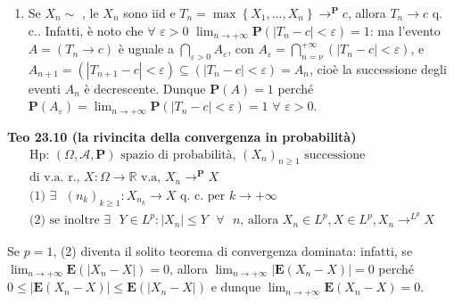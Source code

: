 \documentclass{article}
\begin{document}
\begin{enumerate}
\item Se $X_{n}\sim $ , le $X_{n}$ sono iid e $T_{n}=\max \left\{
X_{1},...,X_{n}\right\} \rightarrow ^{\mathbf{P}}c$, allora $%
T_{n}\rightarrow c$ q. c.. Infatti, \`{e} noto che $\forall $ $\varepsilon
>0 $ $\lim_{n\rightarrow +\infty }\mathbf{P}\left( \left\vert
T_{n}-c\right\vert <\varepsilon \right) =1$: ma l'evento $A=\left(
T_{n}\rightarrow c\right) $ \`{e} uguale a $\bigcap_{\varepsilon
>0}A_{\varepsilon }$, con $A_{\varepsilon }=\bigcap_{n=\nu }^{+\infty
}\left( \left\vert T_{n}-c\right\vert <\varepsilon \right) $, e $%
A_{n+1}=\left( \left\vert T_{n+1}-c\right\vert <\varepsilon \right)
\subseteq \left( \left\vert T_{n}-c\right\vert <\varepsilon \right) =A_{n}$,
cio\`{e} la successione degli eventi $A_{n}$ \`{e} decrescente. Dunque $%
\mathbf{P}\left( A\right) =1$ perch\'{e} $\mathbf{P}\left( A_{\varepsilon
}\right) =\lim_{n\rightarrow +\infty }\mathbf{P}\left( \left\vert
T_{n}-c\right\vert <\varepsilon \right) =1$ $\forall $ $\varepsilon >0$.
\end{enumerate}

\textbf{Teo 23.10 (la rivincita della convergenza in probabilit\`{a})}%
\begin{gather*}
\text{Hp: }\left( \Omega ,\mathcal{A},\mathbf{P}\right) \text{ spazio di
probabilit\`{a}, }\left( X_{n}\right) _{n\geq 1}\text{ successione } \\
\text{di v.a. r., }X:\Omega \rightarrow 
\mathbb{R}
\text{ v.a, }X_{n}\rightarrow ^{\mathbf{P}}X \\
\text{(1) }\exists \text{ }\left( n_{k}\right) _{k\geq
1}:X_{n_{k}}\rightarrow X\text{ q. c. per }k\rightarrow +\infty \\
\text{(2) se inoltre }\exists \text{ }Y\in L^{p}:\left\vert X_{n}\right\vert
\leq Y\text{ }\forall \text{ }n\text{, allora }X_{n}\in L^{p},X\in
L^{p},X_{n}\rightarrow ^{L^{p}}X
\end{gather*}

Se $p=1$, (2) diventa il solito teorema di convergenza dominata: infatti, se 
$\lim_{n\rightarrow +\infty }\mathbf{E}\left( \left\vert X_{n}-X\right\vert
\right) =0$, allora $\lim_{n\rightarrow +\infty }\left\vert \mathbf{E}\left(
X_{n}-X\right) \right\vert =0$ perch\'{e} $0\leq \left\vert \mathbf{E}\left(
X_{n}-X\right) \right\vert \leq \mathbf{E}\left( \left\vert
X_{n}-X\right\vert \right) $ e dunque $\lim_{n\rightarrow +\infty }\mathbf{E}%
\left( X_{n}-X\right) =0$.
\end{document}
